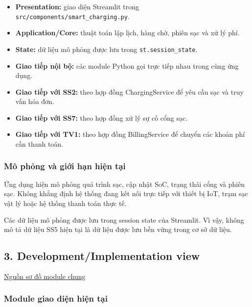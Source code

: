 \documentclass[11pt,a4paper]{article}
\providecommand{\tightlist}{%
  \setlength{\itemsep}{0pt}\setlength{\parskip}{0pt}}
\begin{document}
\begin{itemize}
\tightlist
\item
  \textbf{Presentation:} giao diện Streamlit trong
  \texttt{src/components/smart\_charging.py}.
\item
  \textbf{Application/Core:} thuật toán lập lịch, hàng chờ, phiên sạc và
  xử lý phí.
\item
  \textbf{State:} dữ liệu mô phỏng được lưu trong
  \texttt{st.session\_state}.
\item
  \textbf{Giao tiếp nội bộ:} các module Python gọi trực tiếp nhau trong
  cùng ứng dụng.
\item
  \textbf{Giao tiếp với SS2:} theo hợp đồng ChargingService để yêu cầu
  sạc và truy vấn hóa đơn.
\item
  \textbf{Giao tiếp với SS7:} theo hợp đồng xử lý sự cố cổng sạc.
\item
  \textbf{Giao tiếp với TV1:} theo hợp đồng BillingService để chuyển các
  khoản phí cần thanh toán.
\end{itemize}

\hypertarget{muxf4-phux1ecfng-vuxe0-giux1edbi-hux1ea1n-hiux1ec7n-tux1ea1i}{%
\subsubsection{Mô phỏng và giới hạn hiện
tại}\label{muxf4-phux1ecfng-vuxe0-giux1edbi-hux1ea1n-hiux1ec7n-tux1ea1i}}

Ứng dụng hiện mô phỏng quá trình sạc, cập nhật SoC, trạng thái cổng và
phiên sạc. Không khẳng định hệ thống đang kết nối trực tiếp với thiết bị
IoT, trạm sạc vật lý hoặc hệ thống thanh toán thực tế.

Các dữ liệu mô phỏng được lưu trong session state của Streamlit. Vì vậy,
không mô tả dữ liệu SS5 hiện tại là dữ liệu được lưu bền vững trong cơ
sở dữ liệu.

\hypertarget{developmentimplementation-view}{%
\subsection{3. Development/Implementation
view}\label{developmentimplementation-view}}

\href{../../../diagrams/submission_3/shared/implementation.puml}{Nguồn
sơ đồ module chung}

\hypertarget{module-giao-diux1ec7n-hiux1ec7n-tux1ea1i}{%
\subsubsection{Module giao diện hiện
tại}\label{module-giao-diux1ec7n-hiux1ec7n-tux1ea1i}}
\end{document}
